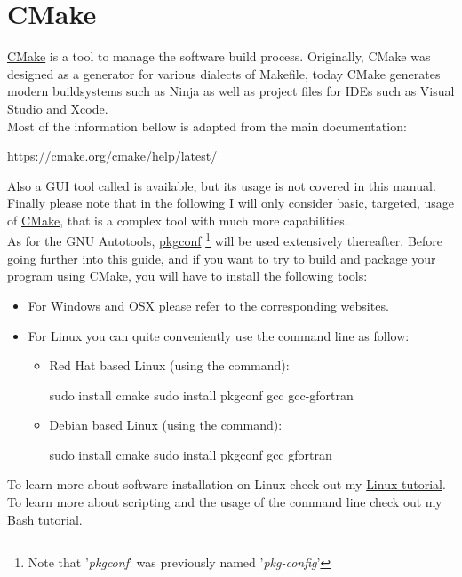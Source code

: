 \section{CMake}

\href{https://cmake.org}{CMake} is a tool to manage the software build process. 
Originally, CMake was designed as a generator for various dialects of Makefile, today CMake generates modern buildsystems such as Ninja as well as project files for IDEs such as Visual Studio and Xcode. \\
Most of the information bellow is adapted from the main documentation: 
\begin{center}\href{https://cmake.org/cmake/help/latest/}{https://cmake.org/cmake/help/latest/} \end{center}
Also a GUI tool called  is available, but its usage is not covered in this manual. \\
Finally please note that in the following I will only consider basic, targeted, usage of \href{https://cmake.org}{CMake}, that is a complex tool with much more capabilities. \\[0.25cm]
As for the GNU Autotools, \href{https://en.wikipedia.org/wiki/Pkg-config}{pkgconf} \footnote{Note that '{\em{pkgconf}}' was previously named '{\em{pkg-config}}'} will be used extensively thereafter.  
Before going further into this guide, and if you want to try to build and package your program using CMake, you will have to install the following tools: 
\begin{itemize}
\item For Windows and OSX please refer to the corresponding websites.
\item For Linux you can quite conveniently use the command line as follow:
\begin{itemize}
\item Red Hat based Linux (using the  command):
\begin{scriptii}
\fprompt{~} sudo  install cmake
\fprompt{~} sudo  install pkgconf gcc gcc-gfortran
\end{scriptii}
\item Debian based Linux (using the  command):
\begin{scriptii}
\uprompt{~} sudo  install cmake
\uprompt{~} sudo  install pkgconf gcc gfortran
\end{scriptii}
\end{itemize}
\end{itemize}
To learn more about software installation on Linux check out my \href{https://www.ipcms.fr/wp-content/uploads/2021/11/linux.pdf}{Linux tutorial}. \\
To learn more about scripting and the usage of the command line check out my \href{https://www.ipcms.fr/wp-content/uploads/2021/05/bash.pdf}{Bash tutorial}. 

